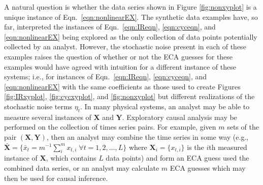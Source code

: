 A natural question is whether the data series shown in Figure \ref{fig:nonxyplot} is a unique instance of Eqn.\ \ref{eqn:nonlinearEX}.  The synthetic data examples have, so far, interpreted the instances of Eqn.\ \ref{eqn:IReqn}, \ref{eqn:cyceqn}, and \ref{eqn:nonlinearEX} being explored as the only collection of data points potentially collected by an analyst.  However, the stochastic noise present in each of these examples raises the question of whether or not the ECA guesses for these examples would have agreed with intuition for a different instance of these systems; i.e., for instances of Eqn.\ \ref{eqn:IReqn}, \ref{eqn:cyceqn}, and \ref{eqn:nonlinearEX} with the same coefficients as those used to create Figures \ref{fig:IRxyplot}, \ref{fig:cycxyplot}, and \ref{fig:nonxyplot} but different realizations of the stochastic noise terms $\eta_t$.  In many physical systems, an analyst may be able to measure several instances of $\mathbf{X}$ and $\mathbf{Y}$.  Exploratory causal analysis may be performed on the collection of times series pairs.  For example, given $m$ sets of the pair $(\mathbf{X},\mathbf{Y})$, then an analyst may combine the time series in some way (e.g., $\bar{\mathbf{X}}=\{\bar{x}_t=m^{-1}\sum^m_i x_{t,i}\;\forall t=1,2,\ldots,L\}$ where $\mathbf{X}_i = \{x_{t,i}\}$ is the $i$th measured instance of $\mathbf{X}$, which contains $L$ data points) and form an ECA guess used the combined data series, or an analyst may calculate $m$ ECA guesses which may then be used for causal inference.  

